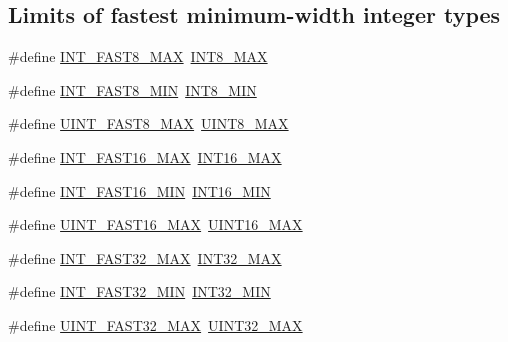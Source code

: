 \subsection*{Limits of fastest minimum-\/width integer types}
\begin{DoxyCompactItemize}
\item 
\#define \hyperlink{group__avr__stdint_gacbcdb3bee0f5f904da5df8de69a80ca3}{I\+N\+T\+\_\+\+F\+A\+S\+T8\+\_\+\+M\+AX}~\hyperlink{group__avr__stdint_gaaf7f29f45f1a513b4748a4e5014ddf6a}{I\+N\+T8\+\_\+\+M\+AX}
\item 
\#define \hyperlink{group__avr__stdint_gaad8fb982cb19143efd5ee9a1a7a89390}{I\+N\+T\+\_\+\+F\+A\+S\+T8\+\_\+\+M\+IN}~\hyperlink{group__avr__stdint_gaadcf2a81af243df333b31efa6461ab8e}{I\+N\+T8\+\_\+\+M\+IN}
\item 
\#define \hyperlink{group__avr__stdint_ga2c6f97ea2d76d0cf6260c84046cdb44e}{U\+I\+N\+T\+\_\+\+F\+A\+S\+T8\+\_\+\+M\+AX}~\hyperlink{group__avr__stdint_gaeb4e270a084ee26fe73e799861bd0252}{U\+I\+N\+T8\+\_\+\+M\+AX}
\item 
\#define \hyperlink{group__avr__stdint_ga2fd35d0ea091e04caec504ff0042cf00}{I\+N\+T\+\_\+\+F\+A\+S\+T16\+\_\+\+M\+AX}~\hyperlink{group__avr__stdint_gac58f2c111cc9989c86db2a7dc4fd84ca}{I\+N\+T16\+\_\+\+M\+AX}
\item 
\#define \hyperlink{group__avr__stdint_ga169460a4e2a79138723d68d99372d958}{I\+N\+T\+\_\+\+F\+A\+S\+T16\+\_\+\+M\+IN}~\hyperlink{group__avr__stdint_gad4e9955955b27624963643eac448118a}{I\+N\+T16\+\_\+\+M\+IN}
\item 
\#define \hyperlink{group__avr__stdint_gaed28ca63d9b222f6f1377358fe73a183}{U\+I\+N\+T\+\_\+\+F\+A\+S\+T16\+\_\+\+M\+AX}~\hyperlink{group__avr__stdint_ga3ea490c9b3617d4479bd80ef93cd5602}{U\+I\+N\+T16\+\_\+\+M\+AX}
\item 
\#define \hyperlink{group__avr__stdint_gac96fa0f41b19e89f109e4f9913ca6635}{I\+N\+T\+\_\+\+F\+A\+S\+T32\+\_\+\+M\+AX}~\hyperlink{group__avr__stdint_ga181807730d4a375f848ba139813ce04f}{I\+N\+T32\+\_\+\+M\+AX}
\item 
\#define \hyperlink{group__avr__stdint_gad93df1652ed0635513d5efe4f1219926}{I\+N\+T\+\_\+\+F\+A\+S\+T32\+\_\+\+M\+IN}~\hyperlink{group__avr__stdint_ga688eb21a22db27c2b2bd5836943cdcbe}{I\+N\+T32\+\_\+\+M\+IN}
\item 
\#define \hyperlink{group__avr__stdint_gad51246a178143208b2db3315efd21c45}{U\+I\+N\+T\+\_\+\+F\+A\+S\+T32\+\_\+\+M\+AX}~\hyperlink{group__avr__stdint_gab5eb23180f7cc12b7d6c04a8ec067fdd}{U\+I\+N\+T32\+\_\+\+M\+AX}
\item 

\end{DoxyCompactItemize}
